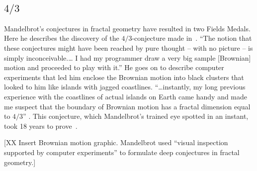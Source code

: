 \documentclass{llncs}
\begin{document}
\subsection{$4/3$}
Mandelbrot's conjectures in fractal geometry have resulted in two
Fields Medals.  Here he describes the discovery of the
$4/3$-conjecture made in~\cite{ManFN}.  
``The notion that these conjectures might have been reached by pure
  thought -- with no picture -- is simply inconceivable.\dots
I had my programmer draw a very big sample [Brownian] motion and
  proceeded to play with it.''
He goes on to describe computer experiments that led him
enclose the Brownian motion into black clusters that looked to him like islands with
jagged coastlines.
%
``\dots instantly, my long previous experience with the coastlines of
  actual islands on Earth came handy and made me suspect that the
  boundary of Brownian motion has a fractal dimension equal to $4/3$''
\cite{Man}.
%
%
This conjecture, which  Mandelbrot's trained eye spotted in an instant,
took 18 years to prove~\cite{LSW01}.

[XX Insert Brownian motion graphic.  Mandelbrot used ``visual
inspection supported by computer experiments'' to formulate deep
conjectures in fractal geometry.]

%
%

\end{document}
